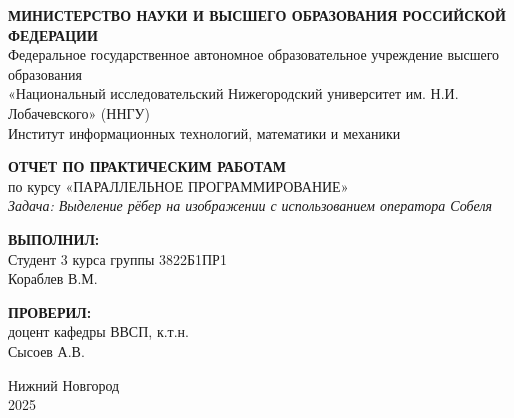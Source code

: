\documentclass[14pt,a4paper]{extarticle}
\begin{document}
\begin{titlepage}
\begin{center}

\onehalfspacing

\begin{center}
    \textbf{МИНИСТЕРСТВО НАУКИ И ВЫСШЕГО ОБРАЗОВАНИЯ РОССИЙСКОЙ ФЕДЕРАЦИИ} \\
    Федеральное государственное автономное образовательное учреждение высшего образования \\
    «Национальный исследовательский Нижегородский университет им. Н.И. Лобачевского» (ННГУ) \\
    Институт информационных технологий, математики и механики
\end{center}

\vspace{4cm}

\begin{center}
    \textbf{ОТЧЕТ ПО ПРАКТИЧЕСКИМ РАБОТАМ} \vspace{0.5cm}\\
    по курсу «ПАРАЛЛЕЛЬНОЕ ПРОГРАММИРОВАНИЕ» \vspace{0.5cm}\\
    \textit{Задача: Выделение рёбер на изображении с использованием оператора Собеля}
\end{center}

\vspace{4cm}

\begin{flushright}
    \textbf{ВЫПОЛНИЛ:} \\ 
    Студент 3 курса 
    группы 3822Б1ПР1 \\ 
    Кораблев В.М. \\

    \vspace{1cm}

    \textbf{ПРОВЕРИЛ:} \\ 
    доцент кафедры ВВСП, к.т.н. \\ 
    Сысоев А.В.
\end{flushright}

\vspace{1cm}

\begin{center}
    Нижний Новгород\\
    2025\newpage
\end{center}

\end{center}
\end{titlepage}
\end{document}
